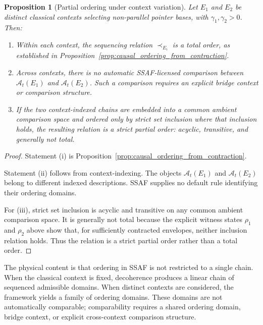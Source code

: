 \documentclass[aps,prx,onecolumn,11pt]{revtex4-2}
\theoremstyle{plain}
\newtheorem{proposition}{Proposition}
\theoremstyle{definition}
\theoremstyle{remark}
\begin{document}
\begin{proposition}[Partial ordering under context variation]
\label{prop:partial_causal_order}
Let \(E_1\) and \(E_2\) be distinct classical contexts selecting
non-parallel pointer bases, with \(\gamma_1,\gamma_2>0\). Then:
\begin{enumerate}[label=(\roman*), leftmargin=2.2em]
\item Within each context, the sequencing relation \(\prec_{E_i}\) is a
total order, as established in
Proposition~\ref{prop:causal_ordering_from_contraction}.

\item Across contexts, there is no automatic SSAF-licensed comparison
between \(\mathcal A_t(E_1)\) and \(\mathcal A_t(E_2)\). Such a
comparison requires an explicit bridge context or comparison structure.

\item If the two context-indexed chains are embedded into a common
ambient comparison space and ordered only by strict set inclusion where
that inclusion holds, the resulting relation is a strict partial order:
acyclic, transitive, and generally not total.
\end{enumerate}
\end{proposition}

\begin{proof}
Statement (i) is Proposition~\ref{prop:causal_ordering_from_contraction}.

Statement (ii) follows from context-indexing. The objects
\(\mathcal A_t(E_1)\) and \(\mathcal A_t(E_2)\) belong to different
indexed descriptions. SSAF supplies no default rule identifying their
ordering domains.

For (iii), strict set inclusion is acyclic and transitive on any common
ambient comparison space. It is generally not total because the explicit
witness states \(\rho_1\) and \(\rho_2\) above show that, for
sufficiently contracted envelopes, neither inclusion relation holds.
Thus the relation is a strict partial order rather than a total order.
\end{proof}

The physical content is that ordering in SSAF is not restricted to a
single chain. When the classical context is fixed, decoherence produces
a linear chain of sequenced admissible domains. When distinct contexts
are considered, the framework yields a family of ordering domains. These
domains are not automatically comparable; comparability requires a
shared ordering domain, bridge context, or explicit cross-context
comparison structure.
\end{document}
